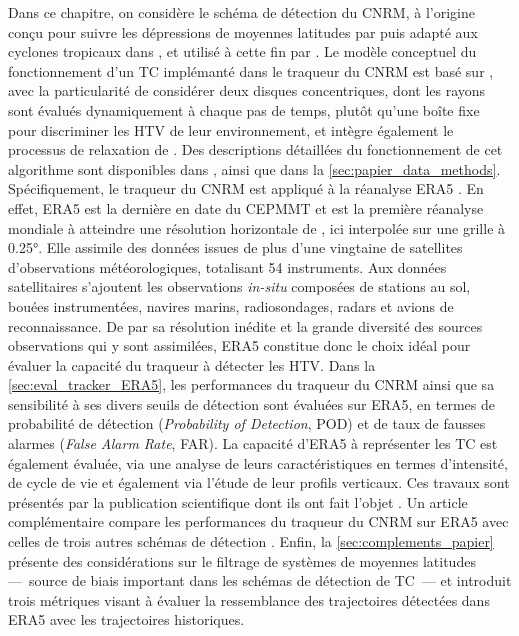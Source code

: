 \documentclass[../main.tex]{subfiles}
\begin{document}
Dans ce chapitre, on considère le schéma de détection du CNRM, à l'origine conçu pour suivre les dépressions de moyennes latitudes par
\cite{ayrault_nouvelle_2000} puis adapté aux cyclones tropicaux dans \cite{chauvin_response_2006}, et utilisé à cette fin par
\cite{daloz_impact_2012,chauvin_atlantic_2017,chauvin_future_2020,cattiaux_projected_2020}. Le modèle conceptuel du fonctionnement d'un TC implémanté dans le
traqueur du CNRM est basé sur \cite{bengtsson_hurricanetype_1995}, avec la particularité de considérer deux disques concentriques, dont les rayons sont évalués
dynamiquement à chaque pas de temps, plutôt qu'une boîte fixe pour discriminer les HTV de leur environnement, et intègre également le processus de relaxation de
\cite{camargo_improving_2002}. Des descriptions détaillées du fonctionnement de cet algorithme sont disponibles dans \cite{chauvin_response_2006}, ainsi que
dans la \cref{sec:papier_data_methods}. Spécifiquement, le traqueur du CNRM est appliqué à la réanalyse ERA5 \parencite{hersbach_era5_2020}. En effet, ERA5 est
la dernière en date du CEPMMT et est la première réanalyse mondiale à atteindre une résolution horizontale de , ici interpolée sur une grille à
\ang{0.25}. Elle assimile des données issues de plus d'une vingtaine de satellites d'observations météorologiques, totalisant \num{54} instruments. Aux données
satellitaires s'ajoutent les observations \textit{in-situ} composées de stations au sol, bouées instrumentées, navires marins, radiosondages, radars et avions
de reconnaissance. De par sa résolution inédite et la grande diversité des sources observations qui y sont assimilées, ERA5 constitue donc le choix idéal pour
évaluer la capacité du traqueur à détecter les HTV. Dans la \cref{sec:eval_tracker_ERA5}, les performances du traqueur du CNRM ainsi que sa sensibilité à ses
divers seuils de détection sont évaluées sur ERA5, en termes de probabilité de détection (\textit{Probability of Detection}, POD) et de taux de fausses alarmes
(\textit{False Alarm Rate}, FAR). La capacité d'ERA5 à représenter les TC est également évaluée, via une analyse de leurs caractéristiques en termes
d'intensité, de cycle de vie et également via l'étude de leur profils verticaux. Ces travaux sont présentés par la publication scientifique dont ils ont fait
l'objet \parencite{dulac_assessing_2023}. Un article complémentaire compare les performances du traqueur du CNRM sur ERA5 avec celles de trois autres schémas de
détection \parencite{bourdin_intercomparison_2022}. Enfin, la \cref{sec:complements_papier} présente des considérations sur le filtrage de systèmes de moyennes
latitudes ---~source de biais important dans les schémas de détection de TC~--- et introduit trois métriques visant à évaluer la ressemblance des trajectoires
détectées dans ERA5 avec les trajectoires historiques.
\end{document}
